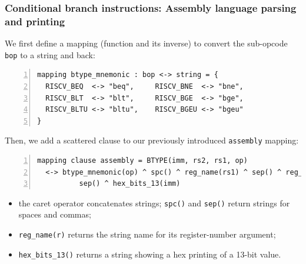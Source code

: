 \documentclass[aspectratio=169]{beamer}
\newcommand{\slidefont}{\scriptsize}
\newcommand{\cf}{\scriptsize\tt}
\begin{document}
\begin{frame}[fragile]
  \frametitle{Conditional branch instructions: Assembly language parsing and printing}

  \slidefont

  We first define a mapping (function and its inverse) to convert the
  sub-opcode {\cf bop} to a string and back:

  \begin{Verbatim}[frame=single, numbers=left, label = File riscv\_insts\_base.sail]
mapping btype_mnemonic : bop <-> string = {
  RISCV_BEQ  <-> "beq",     RISCV_BNE  <-> "bne",
  RISCV_BLT  <-> "blt",     RISCV_BGE  <-> "bge",
  RISCV_BLTU <-> "bltu",    RISCV_BGEU <-> "bgeu"
}
  \end{Verbatim}

  Then, we add a scattered clause to our previously introduced {\cf assembly} mapping:

  \begin{Verbatim}[frame=single, numbers=left, label = File riscv\_insts\_base.sail]
mapping clause assembly = BTYPE(imm, rs2, rs1, op)
  <-> btype_mnemonic(op) ^ spc() ^ reg_name(rs1) ^ sep() ^ reg_name(rs2) ^
          sep() ^ hex_bits_13(imm)
  \end{Verbatim}

  \begin{minipage}{\textwidth}
    \begin{itemize}
    \item the caret operator concatenates strings; {\cf spc()} and {\cf sep()} return strings for spaces and commas;
    \item {\tt reg\_name(r)} returns the string name for its register-number argument;
    \item {\tt hex\_bits\_13()} returns a string showing a hex printing of a 13-bit value.
    \end{itemize}
  \end{minipage}

\end{frame}


\end{document}
